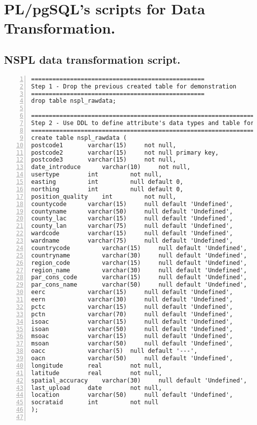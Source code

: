 \newpage 

\section{PL/pgSQL's scripts for Data Transformation.}

\subsection{NSPL data transformation script.}

\lstset{basicstyle=\ttfamily\tiny}  
\begin{lstlisting}[breaklines, frame=single, numbers=left, caption={PL/pgSQL's scripts for NSPL data transformation.}, label=commandline-02]
=================================================
Step 1 - Drop the previous created table for demonstration
=================================================
drop table nspl_rawdata;

===========================================================================================
Step 2 - Use DDL to define attribute's data types and table for data transformation purpose
===========================================================================================
create table nspl_rawdata (
postcode1 		varchar(15) 	not null,
postcode2 		varchar(15) 	not null primary key,
postcode3 		varchar(15) 	not null,
date_introduce 		varchar(10) 	not null, 
usertype 		int 		not null,
easting 		int 		null default 0,
northing 		int 		null default 0,
position_quality 	int 		not null,
countycode 		varchar(15) 	null default 'Undefined',
countyname 		varchar(50) 	null default 'Undefined',
county_lac 		varchar(15) 	null default 'Undefined',
county_lan 		varchar(75) 	null default 'Undefined',
wardcode 		varchar(15) 	null default 'Undefined',
wardname 		varchar(75) 	null default 'Undefined',
countrycode 		varchar(15) 	null default 'Undefined',
countryname 		varchar(30) 	null default 'Undefined',
region_code 		varchar(15) 	null default 'Undefined',
region_name 		varchar(30) 	null default 'Undefined',
par_cons_code 		varchar(15) 	null default 'Undefined',
par_cons_name 		varchar(50) 	null default 'Undefined',
eerc 			varchar(15) 	null default 'Undefined',
eern 			varchar(30) 	null default 'Undefined',
pctc 			varchar(15) 	null default 'Undefined',
pctn 			varchar(70) 	null default 'Undefined',
isoac 			varchar(15) 	null default 'Undefined',
isoan 			varchar(50) 	null default 'Undefined',
msoac 			varchar(15) 	null default 'Undefined',
msoan 			varchar(50) 	null default 'Undefined',
oacc 			varchar(5) 	null default '---',
oacn 			varchar(50) 	null default 'Undefined',
longitude 		real 		not null,
latitude 		real 		not null,
spatial_accuracy	varchar(30) 	null default 'Undefined',
last_upload		date 		not null,
location 		varchar(50) 	null default 'Undefined',
socrataid 		int 		not null
);


\end{lstlisting}
